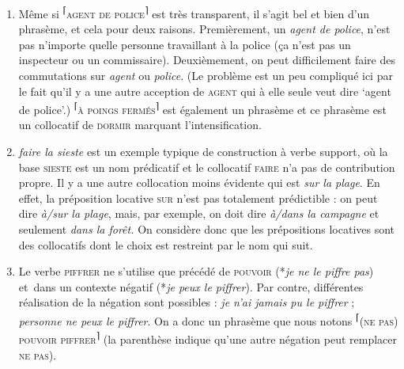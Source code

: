 {    
    \begin{enumerate}
    \item  Même si \textrm{\textsuperscript{⌈}}\textsc{agent} \textsc{de} \textsc{police}\textrm{\textsuperscript{⌉}} est très transparent, il s’agit bel et bien d’un phrasème, et cela pour deux raisons. Premièrement, un \textit{agent de police}, n’est pas n’importe quelle personne travaillant à la police (ça n’est pas un inspecteur ou un commissaire). Deuxièmement, on peut difficilement faire des commutations sur \textit{agent} ou \textit{police}. (Le problème est un peu compliqué ici par le fait qu’il y a une autre acception de \textsc{agent} qui à elle seule veut dire ‘agent de police’.) \textrm{\textsuperscript{⌈}}\textsc{à} \textsc{poings} \textsc{fermés}\textrm{\textsuperscript{⌉}} est également un phrasème et ce phrasème est un collocatif de \textsc{dormir} marquant l’intensification.
    \item  \textit{faire la sieste} est un exemple typique de construction à verbe support, où la base \textsc{sieste} est un nom prédicatif et le collocatif \textsc{faire} n’a pas de contribution propre. Il y a une autre collocation moins évidente qui est \textit{sur la plage}. En effet, la préposition locative \textsc{sur} n’est pas totalement prédictible : on peut dire \textit{à/sur la plage}, mais, par exemple, on doit dire \textit{à/dans la campagne} et seulement \textit{dans la forêt.} On considère donc que les prépositions locatives sont des collocatifs dont le choix est restreint par le nom qui suit.
    \item  Le verbe \textsc{piffrer} ne s’utilise que précédé de \textsc{pouvoir} (*\textit{je ne le piffre pas}) et~dans un contexte négatif (*\textit{je peux le piffrer}). Par contre, différentes réalisation de la négation sont possibles : \textit{je n’ai jamais pu le piffrer} ; \textit{personne ne peux le piffrer}. On a donc un phrasème que nous notons \textrm{\textsuperscript{⌈}}\textsc{(ne} \textsc{pas)} \textsc{pouvoir} \textsc{piffrer}\textrm{\textsuperscript{⌉}} (la parenthèse indique qu’une autre négation peut remplacer \textsc{ne} \textsc{pas}).

\end{enumerate}}
